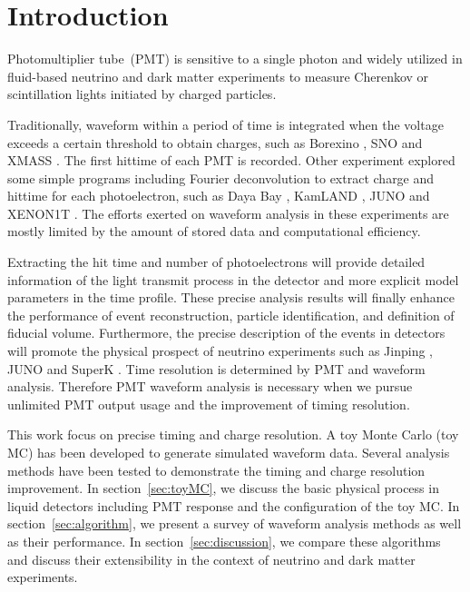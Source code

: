 \section{Introduction}
\label{sec:introduction}

Photomultiplier tube~(PMT) is sensitive to a single photon and widely utilized in fluid-based neutrino and dark matter experiments to measure Cherenkov or scintillation lights initiated by charged particles.

Traditionally, waveform within a period of time is integrated when the voltage exceeds a certain threshold to obtain charges, such as Borexino \cite{lagomarsino_gateless_1999}, SNO \cite{dunger_event_2019} and XMASS \cite{abe_xmass_2013}. The first hittime of each PMT is recorded. Other experiment explored some simple programs including Fourier deconvolution to extract charge and hittime for each photoelectron, such as Daya Bay \cite{huang_flash_2018}, KamLAND \cite{the_kamland_collaboration_production_2010}, JUNO \cite{zhang_comparison_2019} and XENON1T \cite{aprile_xenon1t_2019}. The efforts exerted on waveform analysis in these experiments are mostly limited by the amount of stored data and computational efficiency. 

Extracting the hit time and number of photoelectrons will provide detailed information of the light transmit process in the detector and more explicit model parameters in the time profile. These precise analysis results will finally enhance the performance of event reconstruction, particle identification, and definition of fiducial volume. Furthermore, the precise description of the events in detectors will promote the physical prospect of neutrino experiments such as Jinping \cite{beacom_physics_2017}, JUNO \cite{an_neutrino_2016} and SuperK \cite{noauthor_super-kamiokande_2003}. Time resolution is determined by PMT and waveform analysis. Therefore PMT waveform analysis is necessary when we pursue unlimited PMT output usage and the improvement of timing resolution. 

This work focus on precise timing and charge resolution. A toy Monte Carlo (toy MC) has been developed to generate simulated waveform data. Several analysis methods have been tested to demonstrate the timing and charge resolution improvement. In section~\ref{sec:toyMC}, we discuss the basic physical process in liquid detectors including PMT response and the configuration of the toy MC. In section~\ref{sec:algorithm}, we present a survey of waveform analysis methods as well as their performance. In section~\ref{sec:discussion}, we compare these algorithms and discuss their extensibility in the context of neutrino and dark matter experiments. 
